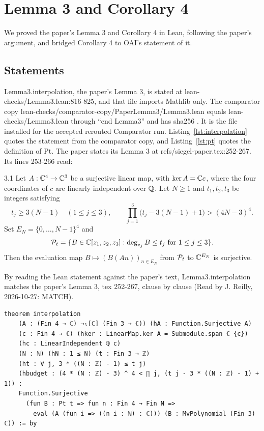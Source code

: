 \section{Lemma 3 and Corollary 4}\label{sec:lemma3}

We proved the paper's Lemma 3 and Corollary 4 in Lean, following the paper's argument, and bridged Corollary 4 to OAI's statement of it.

\subsection{Statements}

Lemma3.interpolation, the paper's Lemma 3, is stated at lean-checks/Lemma3.lean:816-825, and that file imports Mathlib only.
The comparator copy lean-checks/comparator-copy/PaperLemma3/Lemma3.lean equals lean-checks/Lemma3.lean through ``end Lemma3'' and has sha256 .
It is the file installed for the accepted rerouted Comparator run.
Listing~\ref{lst:interpolation} quotes the statement from the comparator copy, and Listing~\ref{lst:pt} quotes the definition of Pt.
The paper states its Lemma 3 at refs/siegel-paper.tex:252-267.
Its lines 253-266 read:
\begin{paperquote}{3.1}
Let $A:\mathbb C^4\to\mathbb C^3$ be a surjective linear map, with $\ker A=\mathbb C c$, where the
four coordinates of $c$ are linearly independent over $\mathbb Q$.
Let $N\ge1$ and $t_1,t_2,t_3$ be integers satisfying
\begin{equation}\label{eq:budget}
 t_j\ge3(N-1)\quad(1\le j\le3),\qquad
 \prod_{j=1}^3\bigl(t_j-3(N-1)+1\bigr)>(4N-3)^4.
\end{equation}
Set $E_N=\{0,\ldots,N-1\}^4$ and
\[
 \mathcal P_t=\{B\in\mathbb C[z_1,z_2,z_3]:\deg_{z_j}B\le t_j
                                      \text{ for }1\le j\le3\}.
\]
Then the evaluation map $B\mapsto(B(An))_{n\in E_N}$ from
$\mathcal P_t$ to $\mathbb C^{E_N}$ is surjective.
\end{paperquote}
By reading the Lean statement against the paper's text, Lemma3.interpolation matches the paper's Lemma 3, tex 252-267, clause by clause (Read by J. Reilly, 2026-10-27: MATCH).

\begin{listing}[tbp]
\caption{Lemma 3, lean-checks/\allowbreak comparator-copy/\allowbreak PaperLemma3/\allowbreak Lemma3.lean:817-826 (sha256 1ce196f5\ldots).}\label{lst:interpolation}
\begin{Verbatim}
theorem interpolation
    (A : (Fin 4 → ℂ) →ₗ[ℂ] (Fin 3 → ℂ)) (hA : Function.Surjective A)
    (c : Fin 4 → ℂ) (hker : LinearMap.ker A = Submodule.span ℂ {c})
    (hc : LinearIndependent ℚ c)
    (N : ℕ) (hN : 1 ≤ N) (t : Fin 3 → ℤ)
    (ht : ∀ j, 3 * ((N : ℤ) - 1) ≤ t j)
    (hbudget : (4 * (N : ℤ) - 3) ^ 4 < ∏ j, (t j - 3 * ((N : ℤ) - 1) + 1)) :
    Function.Surjective
      (fun B : Pt t => fun n : Fin 4 → Fin N =>
        eval (A (fun i => ((n i : ℕ) : ℂ))) (B : MvPolynomial (Fin 3) ℂ)) := by
\end{Verbatim}
\end{listing}

